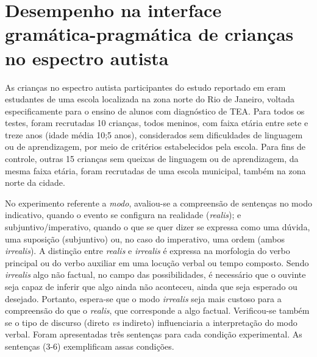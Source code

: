 \documentclass[output=paper,colorlinks,citecolor=brown,booklanguage=portuguese]{langscibook}
\begin{document}
\section{Desempenho na interface gramática-pragmática de crianças no espectro autista}\label{sec:cincocap15}

As crianças no espectro autista participantes do estudo reportado em \citet{Ribeiro2019} eram estudantes de uma escola localizada na zona norte do Rio de Janeiro, voltada especificamente para o ensino de alunos com diagnóstico de TEA. Para todos os testes, foram recrutadas 10 crianças, todos meninos, com faixa etária entre sete e treze anos (idade média 10;5 anos), considerados sem dificuldades de linguagem ou de aprendizagem, por meio de critérios estabelecidos pela escola. Para fins de controle, outras 15 crianças sem queixas de linguagem ou de aprendizagem, da mesma faixa etária, foram recrutadas de uma escola municipal, também na zona norte da cidade.

No experimento referente a \emph{modo}, avaliou-se a compreensão de sentenças no modo indicativo, quando o evento se configura na realidade (\emph{realis}); e subjuntivo/imperativo, quando o que se quer dizer se expressa como uma dúvida, uma suposição (subjuntivo) ou, no caso do imperativo, uma ordem (ambos \emph{irrealis}). A distinção entre \emph{realis} e \emph{irrealis} é expressa na morfologia do verbo principal ou do verbo auxiliar em uma locução verbal ou tempo composto. Sendo \emph{irrealis} algo não factual, no campo das possibilidades, é necessário que o ouvinte seja capaz de inferir que algo ainda não aconteceu, ainda que seja esperado ou desejado. Portanto, espera-se que o modo \emph{irrealis} seja mais custoso para a compreensão do que o \emph{realis}, que corresponde a algo factual. Verificou-se também se o tipo de discurso (direto \emph{vs} indireto) influenciaria a interpretação do modo verbal. Foram apresentadas três sentenças para cada condição experimental. As sentenças (3-6) exemplificam assas condições. 
\end{document}

